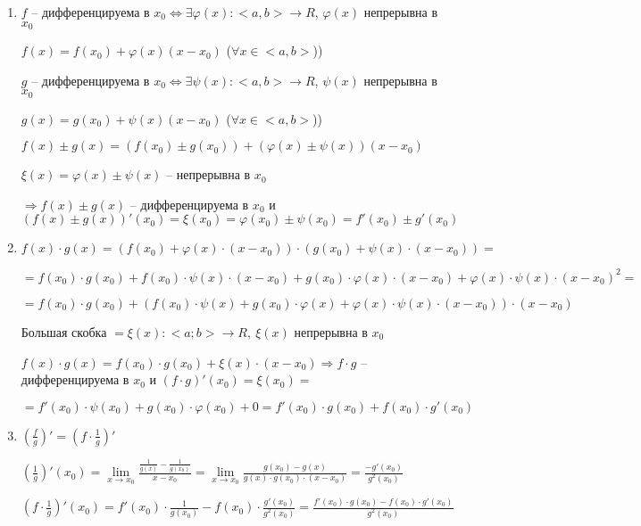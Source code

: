 \documentclass[14pt, letter paper]{article}
\begin{document}
\begin{enumerate}
    \item $f$ -- дифференцируема в $x_0 \Leftrightarrow \exists \varphi(x) : <a, b> \rightarrow R$, $\varphi(x)$ непрерывна в $x_0$
    
    $f(x) = f(x_0) + \varphi(x)(x - x_0)$ ($\forall x \in <a, b>$))

    $g$ -- дифференцируема в $x_0 \Leftrightarrow \exists \psi(x) : <a, b> \rightarrow R$, $\psi(x)$ непрерывна в $x_0$

    $g(x) = g(x_0) + \psi(x)(x - x_0)$ ($\forall x \in <a, b>$))

    $f(x) \pm g(x) = (f(x_0) \pm g(x_0)) + (\varphi(x) \pm \psi(x))(x - x_0)$

    $\xi(x) = \varphi(x) \pm \psi(x)$ -- непрерывна в $x_0$

    $\Rightarrow f(x) \pm g(x)$ -- дифференцируема в $x_0$ и $(f(x) \pm g(x))'(x_0) = \xi(x_0) = \varphi(x_0) \pm \psi(x_0) = f'(x_0) \pm g'(x_0)$

    \item $f(x) \cdot g(x) = (f(x_0) + \varphi(x) \cdot (x - x_0)) \cdot (g(x_0) + \psi(x) \cdot (x - x_0)) =$
    
    $= f(x_0) \cdot g(x_0) + f(x_0) \cdot \psi(x) \cdot (x - x_0) + g(x_0) \cdot \varphi(x) \cdot (x - x_0) + \varphi(x) \cdot \psi(x) \cdot (x - x_0)^2 =$

    $= f(x_0) \cdot g(x_0) + (f(x_0) \cdot \psi(x) + g(x_0) \cdot \varphi(x) + \varphi(x) \cdot \psi(x) \cdot (x - x_0)) \cdot (x - x_0)$

    Большая скобка $= \xi(x) : <a; b> \rightarrow R,\ \xi(x)$ непрерывна в $x_0$

    $f(x) \cdot g(x) = f(x_0) \cdot g(x_0) + \xi(x) \cdot (x - x_0) \Rightarrow f \cdot g$ -- дифференцируема в $x_0$ и $(f \cdot g)'(x_0) = \xi(x_0) =$
    
    $= f'(x_0) \cdot \psi(x_0) + g(x_0) \cdot \varphi(x_0) + 0 = f'(x_0) \cdot g(x_0) + f(x_0) \cdot g'(x_0)$

    \item $(\frac{f}{g})' = (f \cdot \frac{1}{g})'$
    
    $(\frac{1}{g})'(x_0) = \lim\limits_{x \rightarrow x_0} \frac{\frac{1}{g(x)} - \frac{1}{g(x_0)}}{x - x_0} = \lim\limits_{x \rightarrow x_0} \frac{g(x_0) - g(x)}{g(x) \cdot g(x_0) \cdot (x - x_0)} = \frac{-g'(x_0)}{g^2(x_0)}$

    $(f \cdot \frac{1}{g})'(x_0) = f'(x_0) \cdot \frac{1}{g(x_0)} - f(x_0) \cdot \frac{g'(x_0)}{g^2(x_0)} = \frac{f'(x_0) \cdot g(x_0) - f(x_0) \cdot g'(x_0)}{g^2(x_0)}$
\end{enumerate}
\end{document}
